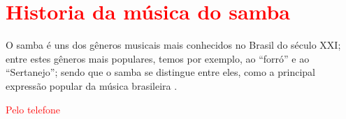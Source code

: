 \section{\textcolor{red}{Historia da música do samba}}

O samba é uns dos gêneros musicais mais conhecidos no Brasil do século XXI;
entre estes gêneros mais populares, temos por exemplo, ao ``forró'' e ao ``Sertanejo'';
sendo que o samba se distingue entre eles, 
como a principal expressão popular da música brasileira \cite[pp. 47]{diniz2008almanaque}. 

\textcolor{red}{Pelo telefone\cite{musicapelotelefone}}
